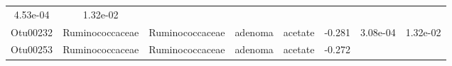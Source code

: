 \documentclass[11pt,]{article}
\begin{document}
\begin{longtable}[]{@{}cccccccc@{}}
\begin{minipage}[t]{0.08\columnwidth}
4.53e-04\strut
\end{minipage} & \begin{minipage}[t]{0.08\columnwidth}\centering\strut
1.32e-02\strut
\end{minipage}\tabularnewline
\begin{minipage}[t]{0.08\columnwidth}\centering\strut
Otu00232\strut
\end{minipage} & \begin{minipage}[t]{0.15\columnwidth}\centering\strut
Ruminococcaceae\strut
\end{minipage} & \begin{minipage}[t]{0.15\columnwidth}\centering\strut
Ruminococcaceae\strut
\end{minipage} & \begin{minipage}[t]{0.08\columnwidth}\centering\strut
adenoma\strut
\end{minipage} & \begin{minipage}[t]{0.09\columnwidth}\centering\strut
acetate\strut
\end{minipage} & \begin{minipage}[t]{0.07\columnwidth}\centering\strut
-0.281\strut
\end{minipage} & \begin{minipage}[t]{0.08\columnwidth}\centering\strut
3.08e-04\strut
\end{minipage} & \begin{minipage}[t]{0.08\columnwidth}\centering\strut
1.32e-02\strut
\end{minipage}\tabularnewline
\begin{minipage}[t]{0.08\columnwidth}\centering\strut
Otu00253\strut
\end{minipage} & \begin{minipage}[t]{0.15\columnwidth}\centering\strut
Ruminococcaceae\strut
\end{minipage} & \begin{minipage}[t]{0.15\columnwidth}\centering\strut
Ruminococcaceae\strut
\end{minipage} & \begin{minipage}[t]{0.08\columnwidth}\centering\strut
adenoma\strut
\end{minipage} & \begin{minipage}[t]{0.09\columnwidth}\centering\strut
acetate\strut
\end{minipage} & \begin{minipage}[t]{0.07\columnwidth}\centering\strut
-0.272\strut
\end{minipage} & \begin{minipage}[t]{0.08\columnwidth}\centering\strut

\end{minipage}
\end{longtable}
\end{document}
